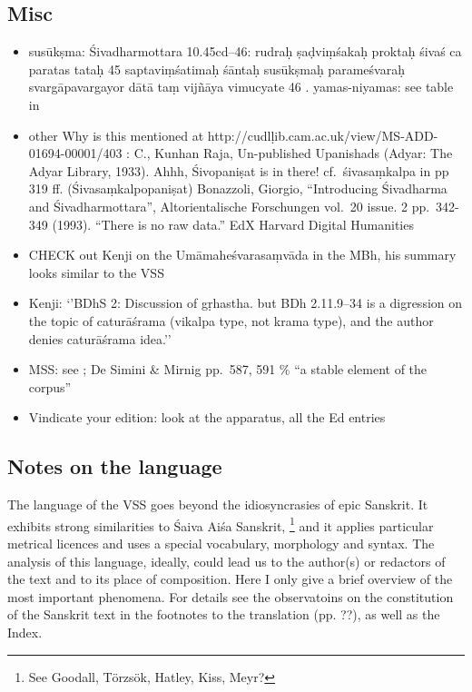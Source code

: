 \documentclass[11pt]{book}
\begin{document}
\subsection{Misc}

\begin{itemize}
\item
  susūkṣma: Śivadharmottara 10.45cd--46: rudraḥ ṣaḍviṃśakaḥ proktaḥ
  śivaś ca paratas tataḥ \textbar{}\textbar{} 45 \textbar{}\textbar{}
  saptaviṃśatimaḥ śāntaḥ susūkṣmaḥ parameśvaraḥ \textbar{}
  svargāpavargayor dātā taṃ vijñāya vimucyate \textbar{}\textbar{} 46
  \textbar{}\textbar{}. yamas-niyamas: see table in 
\item
  other Why is this mentioned at
  http://cudlḷib.cam.ac.uk/view/MS-ADD-01694-00001/403 : C., Kunhan
  Raja, Un-published Upanishads (Adyar: The Adyar Library, 1933). Ahhh,
  Śivopaniṣat is in there! cf.~śivasaṃkalpa in pp 319 ff.
  (Śivasaṃkalpopaniṣat) Bonazzoli, Giorgio, ``Introducing Śivadharma and
  Śivadharmottara'', Altorientalische Forschungen vol.~20 issue. 2
  pp.~342-349 (1993). ``There is no raw data.'' EdX Harvard Digital
  Humanities
\item
  CHECK out Kenji on the Umāmaheśvarasaṃvāda in the MBh, his summary
  looks similar to the VSS
\item
  Kenji: `'BDhS 2: Discussion of gṛhastha. but BDh 2.11.9--34 is a
  digression on the topic of caturāśrama (vikalpa type, not krama type),
  and the author denies caturāśrama idea.''
\item
  MSS: see ; 
  De Simini \& Mirnig
  pp.~587, 591 \% ``a stable element of the corpus''
\item
  Vindicate your edition: look at the apparatus, all the Ed entries
\end{itemize}



\vfill
\pagebreak


\subsection{Notes on the language}

\noindent
The language of the VSS goes beyond the idiosyncrasies of epic Sanskrit.
It exhibits strong similarities to Śaiva Aiśa Sanskrit,%
		\footnote{See Goodall, Törzsök, Hatley, Kiss, Meyr?} 
and it applies particular metrical licences and 
uses a special vocabulary, morphology and syntax.
The analysis of this language, ideally, could lead us to the 
author(s) or redactors of the text and to its
place of composition. Here I only give a brief overview of the most
important phenomena. For details see the observatoins 
on the constitution of the Sanskrit text in the footnotes 
to the translation (pp. ??), as well as the Index.
\end{document}
